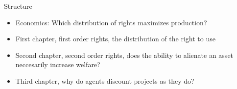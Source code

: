 \documentclass{beamer}
\numberwithin{equation}{section}
\begin{document}
\begin{frame}{Structure}
\begin{itemize}
    \item Economics: Which distribution of rights maximizes production?
    \item First chapter, first order rights, the distribution of the right to use
    \item Second chapter, second order rights, does the ability to alienate an asset neccesarily increase welfare?
    \item Third chapter, why do agents discount projects as they do? 
\end{itemize}
\end{frame}

\end{document}
